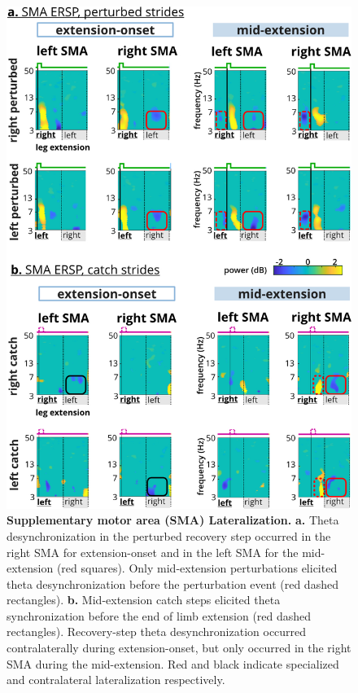\documentclass[../thesis_seyed.tex]{subfiles}
\begin{document}
\begin{figure}[H]
\centerline{\includegraphics{../img/hyp4- lateraliztion.jpg}}
\caption{\textbf{Supplementary motor area (SMA) Lateralization.} \textbf{a.} Theta desynchronization in the perturbed recovery step occurred in the right SMA for extension-onset and in the left SMA for the mid-extension (red squares). Only mid-extension perturbations elicited theta desynchronization before the perturbation event (red dashed rectangles). \textbf{b.} Mid-extension catch steps elicited theta synchronization before the end of limb extension (red dashed rectangles). Recovery-step theta desynchronization occurred contralaterally during extension-onset, but only occurred in the right SMA during the mid-extension. Red and black indicate specialized and contralateral lateralization respectively.}
\label{fig:fig8}
\end{figure}
\end{document}
